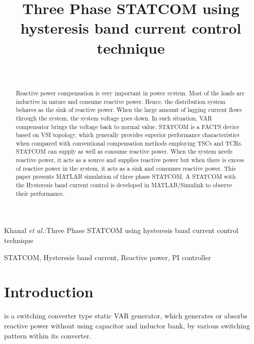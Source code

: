 \documentclass[journal,twoside]{IEEEtran}
\begin{document}
    \setcounter{page}{50}
    \title{Three Phase STATCOM using hysteresis band current control technique}
    \author{\\
    }


%
{Khanal \MakeLowercase{\textit{et al.}}:Three Phase STATCOM using hysteresis band current control technique}

    \maketitle
	\begin{abstract}
Reactive power compensation is very
important in power system. Most of the loads
are inductive in nature and consume reactive
power. Hence, the distribution system behaves
as the sink of reactive power. When the large
amount of lagging current flows through the
system, the system voltage goes down. In such
situation, VAR compensator brings the voltage
back to normal value. STATCOM is a FACTS
device based on VSI topology, which generally
provides superior performance characteristics
when
compared
with
conventional
compensation methods employing TSCs and
TCRs. STATCOM can supply as well as consume
reactive power. When the system needs
reactive power, it acts as a source and supplies
reactive power but when there is excess of
reactive power in the system, it acts as a sink
and consumes reactive power. This paper
presents MATLAB simulation of three phase
STATCOM. A STATCOM with the Hysteresis
band current control is developed in
MATLAB/Simulink
to
observe
their
performance.
	\end{abstract}
	\begin{IEEEkeywords}
STATCOM, Hysteresis band
current, Reactive power, PI controller

	\end{IEEEkeywords}
	\section{Introduction}
 is a switching converter type static
VAR generator, which generates or absorbs
reactive power without using capacitor and
inductor bank, by various switching pattern
within its converter.

\bigskip
\end{document}
